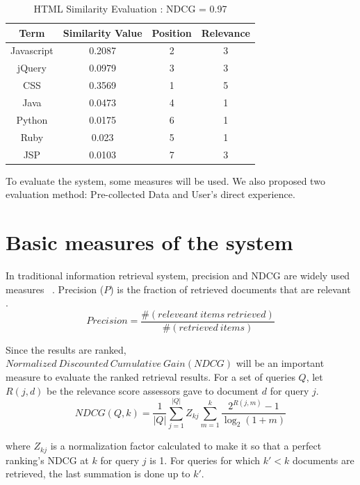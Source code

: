 \begin{table}
\centering
\caption{ HTML Similarity Evaluation : NDCG = 0.97 }
\begin{tabular}{ | c | c | c  | c |  }
 \hline
    Term      &  Similarity Value  &  Position   & Relevance     \\  \hline
  Javascript   &  0.2087           &      2      &   3        \\
     jQuery    &  0.0979           &      3      &   3         \\
     CSS     &  0.3569             &      1      &   5   \\
     Java    &  0.0473             &      4      &   1   \\
    Python   &  0.0175             &      6      &   1   \\
     Ruby    &  0.023              &      5      &   1    \\
     JSP     &  0.0103             &      7      &   3    \\
 \hline
\end{tabular}
\label{tab:simcompare2}
\end{table}



To evaluate the system, some measures will be used. We also proposed two evaluation method: Pre-collected Data and User's direct experience.

\section{Basic measures of the system}

In traditional information retrieval system, precision and NDCG are widely used measures ~\cite{manning2008introduction}.     Precision ($P$) is the fraction of retrieved documents that are relevant .
       $$  Precision =  \frac{ \#(releveant~items~ retrieved)}{ \#(retrieved~items)}$$
   
Since the results are ranked, $ Normalized~Discounted~Cumulative~Gain ( NDCG )$ will be an important measure to evaluate the ranked retrieval results. For a set of queries $Q$, let $R(j,d)$ be the relevance score assessors gave to document $d$ for query $j$.
       $$ NDCG(Q,k) = \frac {1}{|Q|} \sum_{j=1}^{|Q|}{Z_{kj}} \sum_{m=1}^{k} \frac{2^{R(j,m)} - 1}{ \log_2(1+m)} $$
       
where $Z_{kj}$ is a normalization factor calculated to make it so that a perfect ranking's NDCG at $k$ for query $j$ is 1. For queries for which $k' < k$ documents are retrieved, the last summation is done up to $k'$.
 

